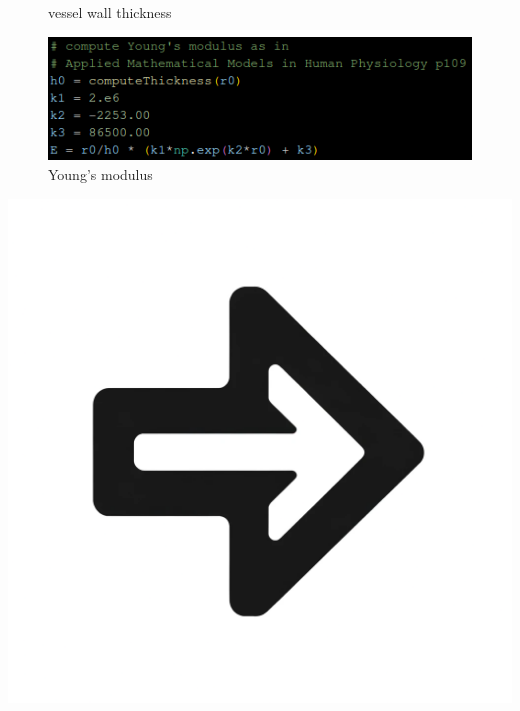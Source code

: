 \documentclass{beamer}
\begin{document}
\begin{frame}
\begin{minipage}{0.25\textwidth}
\begin{figure}
				\caption*{vessel wall thickness}
				\includegraphics[width=\textwidth]{images/config3.png}
				\caption*{Young's modulus}
			\end{figure}
		\end{minipage}
		\begin{minipage}{0.1\textwidth}
			\includegraphics[width=\textwidth]{images/right_arrow.png}
		\end{minipage}
		\begin{minipage}{0.25\textwidth}
			\begin{figure}

\end{figure}
\end{minipage}
\end{frame}
\end{document}
